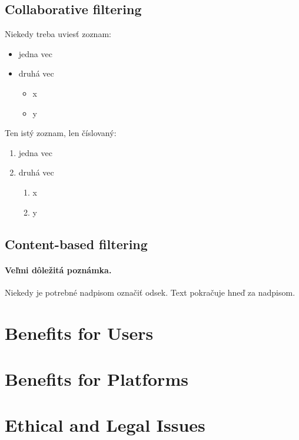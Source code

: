 \documentclass[10pt,twoside,slovak,a4paper]{article}
\begin{document}
\subsection{Collaborative filtering} \label{Types of recommendation systems:Collaborative filtering}

Niekedy treba uviesť zoznam:

\begin{itemize}
\item jedna vec
\item druhá vec
	\begin{itemize}
	\item x
	\item y
	\end{itemize}
\end{itemize}

Ten istý zoznam, len číslovaný:

\begin{enumerate}
\item jedna vec
\item druhá vec
	\begin{enumerate}
	\item x
	\item y
	\end{enumerate}
\end{enumerate}


\subsection{Content-based filtering} \label{Types of recommendation systems:Content-based filtering}

\paragraph{Veľmi dôležitá poznámka.}
Niekedy je potrebné nadpisom označiť odsek. Text pokračuje hneď za nadpisom.


\section{Benefits for Users} \label{Benefits for Users}


\section{Benefits for Platforms} \label{Benefits for Platforms}

\section{Ethical and Legal Issues} \label{Ethical and Legal Issues}
\end{document}
